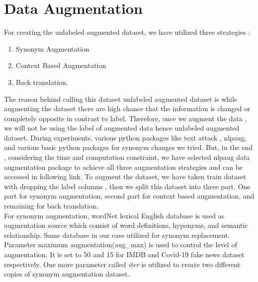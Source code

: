\documentclass[%
	BCOR=8mm, %
	DIV=12, 
	toc=bibliography, %
	toc=listof, %
	oneside, %
	egregdoesnotlikesansseriftitles, %
	]{scrbook}
\begin{document}


\section{Data Augmentation}
For creating the unlabeled augmented dataset, we have utilized three strategies :
\begin{enumerate}
\item  Synonym Augmentation
\item Context Based Augmentation 
\item Back translation. 
\end{enumerate}
The reason behind calling this dataset unlabeled augmented dataset is while augmenting the dataset there are high chance that the information is changed or completely
 opposite in contrast to label. Therefore, once we augment the data , we will not be using the label of augmented data hence unlabeled augmented dataset. 
During experiments, various python packages like text attack , nlpaug, and various basic python packages for synonym changes we tried. But, in the end , considering 
the time and computation constraint,  we have selected nlpaug data augmentation package to achieve all three augmentation strategies and can be accessed in following link.  
To augment the dataset, we have taken train dataset with dropping the label columns , then we split this dataset into three part. One part for synonym augmentation, second 
part for context based augmentation, and remaining for back translation. \\

For synonym augmentation, wordNet lexical English database is used as augmentation source which consist of word definitions, hyponyms, and semantic relationship. 
Same database in our case utilized for synonym replacement. Parameter maximum augmentation(aug\_max) is used to control the level of augmentation. It is set to 50 and 
15 for IMDB and Covid-19 fake news dataset respectively. One more parameter called \textit{iter} is utilized to create two different copies of synonym augmentation dataset.\\
\end{document}
